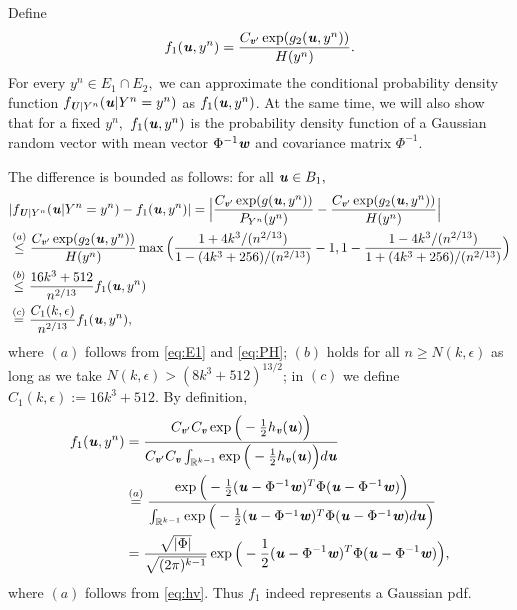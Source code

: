 \documentclass[11pt,onecolumn]{IEEEtran}
\def\mathbi#1{{\textbf{\textit #1}}}
\begin{document}
\vspace*{.1in}
Define
\begin{equation}\label{eq:f1}
f_1(\mathbi{u},y^n)= \frac{C_{\mathbi{v}'} \exp(g_2(\mathbi{u},y^n))}{H(y^n)}.
\end{equation}
For every $y^n \in E_1\cap E_2,$ we can approximate the conditional probability density function $f_{\mathbi{U}|Y^n}(\mathbi{u}|Y^n=y^n)$ as $f_1(\mathbi{u},y^n)$. At the same time, we will also show that for a fixed $y^n,$ $f_1(\mathbi{u},y^n)$ is the probability density function of a Gaussian random vector with mean vector $\Phi^{-1}\mathbi{w}$ and covariance matrix $\Phi^{-1}.$


The difference is bounded as follows: for all $\mathbi{u}\in B_1,$
  \begin{align}
  & |f_{\mathbi{U}|Y^n}(\mathbi{u}|Y^n=y^n) - f_1(\mathbi{u},y^n) | = 
\Big|\frac{C_{\mathbi{v}'} \exp(g(\mathbi{u},y^n))}{P_{Y^n}(y^n)} - 
\frac{C_{\mathbi{v}'} \exp(g_2(\mathbi{u},y^n))}{H(y^n)} \Big| \nonumber\\
&\overset{(a)}{\le}  \frac{C_{\mathbi{v}'} \exp(g_2(\mathbi{u},y^n)) }{H(y^n)}
\max\Big(\frac{1 +4k^3/(n^{2/13}) }{1 - (4k^3+256)/(n^{2/13}) } -1, 
1- \frac{1 - 4k^3/(n^{2/13}) }{1 + (4k^3+256)/(n^{2/13}) } \Big) \nonumber\\
&\overset{(b)}{\le}  \frac{16k^3 + 512}{n^{2/13} } f_1(\mathbi{u},y^n)\nonumber\\
&\overset{(c)}{=} \frac{C_1(k,\epsilon)}{n^{2/13} } f_1(\mathbi{u},y^n)
,\label{eq:ff1}
\end{align}
where $(a)$ follows from \eqref{eq:E1} and \eqref{eq:PH}; $(b)$ holds for all $n\ge N(k,\epsilon)$ as long as we take $N(k,\epsilon)>(8k^3+512)^{13/2}$;
in $(c)$ we define $C_1(k,\epsilon) := 16k^3 + 512$.
By definition,
   \begin{align}
f_1(\mathbi{u},y^n) & = \frac{C_{\mathbi{v}'}  C_{\mathbi{v}}
\exp\Big( - \frac{1}{2} h_{\mathbi{v}}(\mathbi{u})  \Big) }
{C_{\mathbi{v}'}  C_{\mathbi{v}}  \int_{\mathbb{R}^{k-1}} 
\exp\Big( - \frac{1}{2} h_{\mathbi{v}}(\mathbi{u})  \Big) d\mathbi{u} }\nonumber \\
& \overset{(a)}{=} \frac{ \exp\Big( - \frac{1}{2} (\mathbi{u} - \Phi^{-1}\mathbi{w})^T \Phi (\mathbi{u} - \Phi^{-1}\mathbi{w})  \Big) }
{  \int_{\mathbb{R}^{k-1}} 
\exp\Big( - \frac{1}{2} (\mathbi{u} - \Phi^{-1}\mathbi{w})^T \Phi (\mathbi{u} - \Phi^{-1}\mathbi{w})  
 d\mathbi{u} \Big)} \nonumber \\
& = \frac{\sqrt{|\Phi|}}{\sqrt{(2\pi)^{k-1}}}
 \exp\Big( - \frac{1}{2} (\mathbi{u} - \Phi^{-1}\mathbi{w})^T \Phi (\mathbi{u} - \Phi^{-1}\mathbi{w})  \Big),
 \label{eq:expf1}
\end{align}
where $(a)$ follows from \eqref{eq:hv}. Thus $f_1$ indeed represents a Gaussian pdf. 
\end{document}
